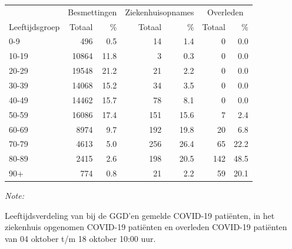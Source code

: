 \documentclass[
  english,
  man,floatsintext]{apa6}
\begin{document}
\begin{table}[H]
\centering\begingroup\fontsize{11}{13}\selectfont

\begin{threeparttable}
\begin{tabular}{lrrrrrr}
\toprule
\multicolumn{1}{c}{ } & \multicolumn{2}{c}{Besmettingen} & \multicolumn{2}{c}{Ziekenhuisopnames} & \multicolumn{2}{c}{Overleden} \\
\cmidrule(l{3pt}r{3pt}){2-3} \cmidrule(l{3pt}r{3pt}){4-5} \cmidrule(l{3pt}r{3pt}){6-7}
Leeftijdsgroep & Totaal & \% & Totaal & \% & Totaal & \%\\
\midrule
0-9 & 496 & 0.5 & 14 & 1.4 & 0 & 0.0\\
10-19 & 10864 & 11.8 & 3 & 0.3 & 0 & 0.0\\
20-29 & 19548 & 21.2 & 21 & 2.2 & 0 & 0.0\\
30-39 & 14068 & 15.2 & 34 & 3.5 & 0 & 0.0\\
40-49 & 14462 & 15.7 & 78 & 8.1 & 0 & 0.0\\
50-59 & 16086 & 17.4 & 151 & 15.6 & 7 & 2.4\\
60-69 & 8974 & 9.7 & 192 & 19.8 & 20 & 6.8\\
70-79 & 4613 & 5.0 & 256 & 26.4 & 65 & 22.2\\
80-89 & 2415 & 2.6 & 198 & 20.5 & 142 & 48.5\\
90+ & 774 & 0.8 & 21 & 2.2 & 59 & 20.1\\
\bottomrule
\end{tabular}
\begin{tablenotes}
\item \textit{Note: } 
\item Leeftijdsverdeling van bij de GGD’en gemelde COVID-19 patiënten, in het ziekenhuis opgenomen COVID-19 patiënten en overleden COVID-19 patiënten van 04 oktober t/m 18 oktober 10:00 uur.
\end{tablenotes}
\end{threeparttable}
\endgroup{}
\end{table}
\end{document}

